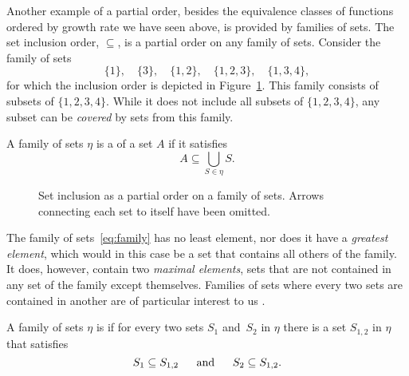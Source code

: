 Another example of a partial order, besides the equivalence classes of functions ordered by growth rate we have seen above, is provided by families of sets.
The set inclusion order, $\subseteq$, is a partial order on any family of sets.
Consider the family of sets
\begin{equation}
\label{eq:family}
  \{1\},\quad\{3\},\quad\{1, 2\},\quad\{1, 2, 3\},\quad\{1, 3, 4\},
\end{equation}
for which the inclusion order is depicted in Figure~\ref{fig:family}.
This family consists of subsets of $\{1, 2, 3, 4\}$.
While it does not include all subsets of $\{1, 2, 3, 4\}$, any subset can be \emph{covered} by sets from this family.
\begin{definition}
  A family of sets $\eta$ is a  of a set $A$ if it satisfies
  \begin{equation*}
    A \subseteq \bigcup_{S \in \eta} S.
  \end{equation*}
\end{definition}

\begin{figure}[bp]
  \centering
  \caption{
    Set inclusion as a partial order on a family of sets.
    Arrows connecting each set to itself have been omitted.
  }
  \label{fig:family}
\end{figure}

The family of sets~\eqref{eq:family} has no least element, nor does it have a \emph{greatest element}, which would in this case be a set that contains all others of the family.
It does, however, contain two \emph{maximal elements}\label{def:maximal}, sets that are not contained in any set of the family except themselves.
Families of sets where every two sets are contained in another are of particular interest to us \parencite[see also][]{abramsky1994domain,davey2002introduction}.
\begin{definition}
  A family of sets $\eta$ is  if for every two sets $S_1$ and~$S_2$ in $\eta$ there is a set $S_{1,2}$ in $\eta$ that satisfies
  \begin{equation*}
    S_1 \subseteq S_{1,2} \quad\;\text{ and }\;\quad S_2 \subseteq S_{1,2}.
  \end{equation*}
\end{definition}

